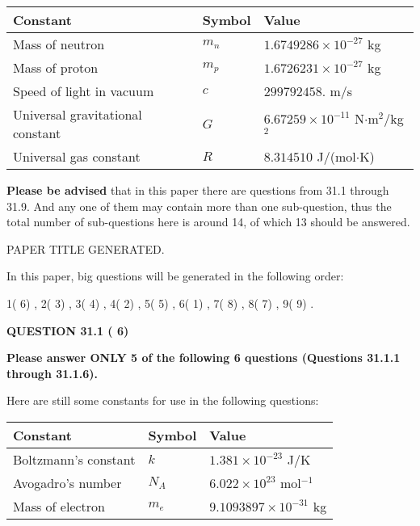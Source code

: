 \documentclass[12pt]{article}
\begin{document}
 
\noindent\begin{tabular}{|l|l|l|}
\hline
Constant & Symbol & Value \\
\hline
Mass of neutron &
$m_n$ &
 $ 1.6749286 \times 10^{-27} $
kg \\
\hline
Mass of proton &
$m_p$ &
 $ 1.6726231 \times 10^{-27} $
kg \\
\hline
Speed of light in vacuum &
$c$ &
 $ 299792458. $
m/s \\
\hline
Universal gravitational constant &
$G$ &
 $ 6.67259 \times 10^{-11} $
N$\cdot $m$^2$/kg$^2$ \\
\hline
Universal gas constant &
$R$ &
 $ 8.314510 $
J/(mol$\cdot $K) \\
\hline
\end{tabular}
 
 
{\textbf{\large{Please be advised}}} that in this paper there are questions from
31.1 through
31.9.
And any one of them may contain more than one sub-question, thus the total number
of sub-questions here is around 14, of which
13 should be answered.
 
\vspace{0.3in}
 
 
   
   
 PAPER TITLE GENERATED.
   
   
   
\vspace{0.2in}
   
In this paper, big questions will be generated in the following order: 
   
   
            1(          6)
 ,
            2(          3)
 ,
            3(          4)
 ,
            4(          2)
 ,
            5(          5)
 ,
            6(          1)
 ,
            7(          8)
 ,
            8(          7)
 ,
            9(          9)
 .
  
\vspace{0.2in}
  
{\textbf{\Large{QUESTION
31.1 
 (          6)
}}}
  
  
 
{\textbf{\Large{Please answer ONLY
5 of the following
6 questions (Questions
31.1.1 through
31.1.6). }}}
 
Here are still some constants for use in the following questions:
 
 
\noindent\begin{tabular}{|l|l|l|}
\hline
Constant & Symbol & Value \\
\hline
 
Boltzmann's constant &
$k$ &
 $ 1.381 \times 10^{-23} $
J/K \\
\hline
 
Avogadro's number &
$N_A$ &
 $ 6.022 \times 10^{23} $
mol$^{-1}$ \\
\hline
 
Mass of electron &
$m_e$ &
 $ 9.1093897 \times 10^{-31} $
kg \\
\hline
 
\end{tabular}
 
\end{document}
